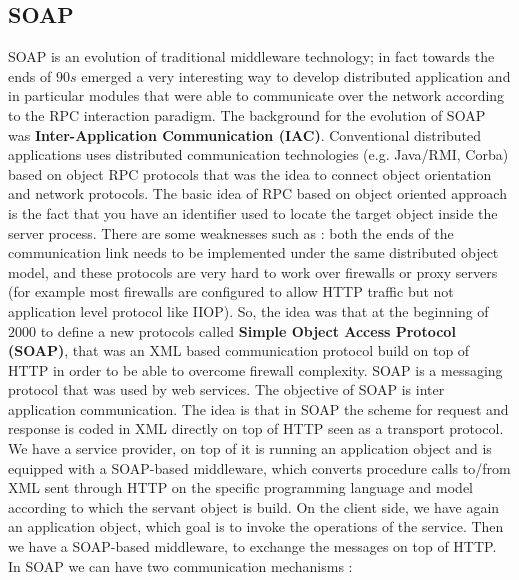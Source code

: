 \documentclass[11pt]{article}
\begin{document}
\subsection{SOAP}
SOAP is an evolution of traditional middleware technology; in fact towards the ends of $90s$ emerged a very interesting way to develop distributed application and in particular modules that were able to communicate over the network according to the RPC interaction paradigm. The background for the evolution of SOAP was \textbf{Inter-Application Communication (IAC)}. Conventional distributed applications uses distributed communication technologies (e.g. Java/RMI, Corba) based on object RPC protocols that was the idea to connect object orientation and network protocols. The basic idea of RPC based on object oriented approach is the fact that you have an identifier used to locate the target object inside the server process. There are some weaknesses such as : both the ends of the communication link needs to be implemented under the same distributed object model, and these protocols are very hard to work over firewalls or proxy servers (for example most firewalls are configured to allow HTTP traffic but not application level protocol like IIOP). So, the idea was that at the beginning of $2000$ to define a new protocols called \textbf{Simple Object Access Protocol (SOAP)}, that was an XML based communication protocol build on top of HTTP in order to be able to overcome firewall complexity. SOAP is a messaging protocol that was used by web services. The objective of SOAP is inter application communication. The idea is that in SOAP the scheme for request and response is coded in XML directly on top of HTTP seen as a transport protocol. We have a service provider, on top of it is running an application object and is equipped with a SOAP-based middleware, which converts procedure calls to/from XML sent through HTTP on the specific programming language and model according to which the servant object is build. On the client side, we have again an application object, which goal is to invoke the operations of the service. Then we have a SOAP-based middleware, to exchange the messages on top of HTTP. In SOAP we can have two communication mechanisms :
\end{document}
